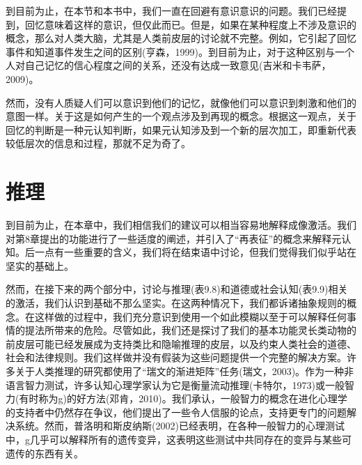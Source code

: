 到目前为止，在本节和本书中，我们一直在回避有意识意识的问题。我们已经提到，回忆意味着这样的意识，但仅此而已。但是，如果在某种程度上不涉及意识的概念，那么对人类大脑，尤其是人类前皮层的讨论就不完整。例如，它引起了回忆事件和知道事件发生之间的区别(亨森，1999)。到目前为止，对于这种区别与一个人对自己记忆的信心程度之间的关系，还没有达成一致意见(吉米和卡韦萨，2009)。

然而，没有人质疑人们可以意识到他们的记忆，就像他们可以意识到刺激和他们的意图一样。关于这是如何产生的一个观点涉及到再现的概念。根据这一观点，关于回忆的判断是一种元认知判断，如果元认知涉及到一个新的层次加工，即重新代表较低层次的信息和过程，那就不足为奇了。

\section{推理}

到目前为止，在本章中，我们相信我们的建议可以相当容易地解释成像激活。我们对第8章提出的功能进行了一些适度的阐述，并引入了“再表征”的概念来解释元认知。后一点有一些重要的含义，我们将在结束语中讨论，但我们觉得我们似乎站在坚实的基础上。

然而，在接下来的两个部分中，讨论与推理(表9.8)和道德或社会认知(表9.9)相关的激活，我们认识到基础不那么坚实。在这两种情况下，我们都诉诸抽象规则的概念。在这样做的过程中，我们充分意识到使用一个如此模糊以至于可以解释任何事情的提法所带来的危险。尽管如此，我们还是探讨了我们的基本功能灵长类动物的前皮层可能已经发展成为支持类比和隐喻推理的皮层，以及约束人类社会的道德、社会和法律规则。我们这样做并没有假装为这些问题提供一个完整的解决方案。许多关于人类推理的研究都使用了“瑞文的渐进矩阵”任务(瑞文，2003)。作为一种非语言智力测试，许多认知心理学家认为它是衡量流动推理(卡特尔，1973)或一般智力(有时称为g)的好方法(邓肯，2010)。我们承认，一般智力的概念在进化心理学的支持者中仍然存在争议，他们提出了一些令人信服的论点，支持更专门的问题解决系统。然而，普洛明和斯皮纳斯(2002)已经表明，在各种一般智力的心理测试中，g几乎可以解释所有的遗传变异，这表明这些测试中共同存在的变异与某些可遗传的东西有关。

